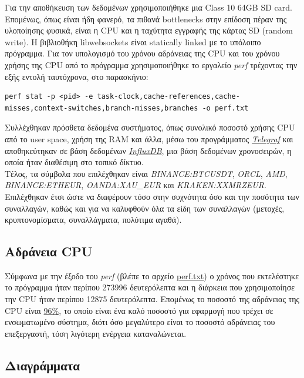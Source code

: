 \documentclass[11pt]{article}
\begin{document}
Για την αποθήκευση των δεδομένων χρησιμοποιήθηκε μια Class 10 64GB SD card. Επομένως, όπως είναι ήδη φανερό, τα πιθανά bottlenecks στην επίδοση πέραν της υλοποίησης φυσικά, είναι η CPU και η ταχύτητα εγγραφής της κάρτας SD (random write). Η βιβλιοθήκη libwebsockets είναι statically linked με το υπόλοιπο πρόγραμμα. Για τον υπολογισμό του χρόνου αδράνειας της CPU και του χρόνου χρήσης της CPU από το πρόγραμμα χρησιμοποιήθηκε το εργαλείο \emph{perf}\autocite{sites:perf-wiki} τρέχοντας την εξής εντολή ταυτόχρονα, στο παρασκήνιο:

\begin{verbatim}
perf stat -p <pid> -e task-clock,cache-references,cache-misses,context-switches,branch-misses,branches -o perf.txt
\end{verbatim}


Συλλέχθηκαν πρόσθετα δεδομένα συστήματος, όπως συνολικό ποσοστό χρήσης CPU από το user space, χρήση της RAM και άλλα, μέσω του προγράμματος \href{https://www.influxdata.com/time-series-platform/telegraf/}{\emph{Telegraf}} και αποθηκεύτηκαν σε βάση δεδομένων \href{https://www.influxdata.com}{\emph{InfluxDB}}, μια βάση δεδομένων χρονοσειρών, η οποία ήταν διαθέσιμη στο τοπικό δίκτυο. \\

Τέλος, τα σύμβολα που επιλέχθηκαν είναι \emph{BINANCE:BTCUSDT}, \emph{ORCL}, \emph{AMD}, \emph{BINANCE:ETHEUR}, \emph{OANDA:XAU\_EUR} και \emph{KRAKEN:XXMRZEUR}. Επιλέχθηκαν έτσι ώστε να διαφέρουν τόσο στην συχνότητα όσο και την ποσότητα των συναλλαγών, καθώς και για να καλυφθούν όλα τα είδη των συναλλαγών (μετοχές, κρυπτονομίσματα, συναλλάγματα, πολύτιμα αγαθά).

\pagebreak
\subsection{Αδράνεια CPU}
\label{sec:org250cd24}
Σύμφωνα με την έξοδο του \emph{perf} (βλέπε το αρχείο \href{https://github.com/thetonk/tradestats/blob/main/report/perf.txt}{perf.txt}) ο χρόνος που εκτελέστηκε το πρόγραμμα ήταν περίπου 273996 δευτερόλεπτα και η διάρκεια που χρησιμοποίησε την CPU ήταν περίπου 12875 δευτερόλεπτα. Επομένως το ποσοστό της αδράνειας της CPU είναι \uline{96\%}, το οποίο είναι ένα καλό ποσοστό για εφαρμογή που τρέχει σε ενσωματωμένο σύστημα, διότι όσο μεγαλύτερο είναι το ποσοστό αδράνειας του επεξεργαστή, τόση λιγότερη ενέργεια καταναλώνεται\autocite{inproceedings:power-usage}.
\subsection{Διαγράμματα}
\label{sec:orgb6430fa}
\end{document}
